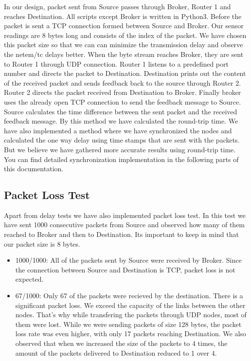 \documentclass[conference]{IEEEtran}
\begin{document}
In our design, packet sent from Source passes through Broker, Router 1 and reaches Destination. All scripts except Broker is written in Python3. Before the packet is sent a TCP connection formed between Source and Broker. Our sensor readings are 8 bytes long and consists of the index of the packet. We have chosen this packet size so that we can can minimize the transmission delay and observe the netem/tc delays better. When the byte stream reaches Broker, they are sent to Router 1 through UDP connection. Router 1 listens to a predefined port number and directs the packet to Destination. Destination prints out the content of the received packet and sends feedback back to the source through Router 2. Router 2 directs the packet received from Destination to Broker. Finally broker uses the already open TCP connection to send the feedback message to Source. Source calculates the time difference between the sent packet and the received feedback message. By this method we have calculated the round-trip time. We have also implemented a method where we have synchronized the nodes and calculated the one way delay using time stamps that are sent with the packets. But we believe we have gathered more accurate results using round-trip time. You can find detailed synchronization implementation in the following parts of this documentation.

\subsection{Packet Loss Test}\label{AA}

Apart from delay tests we have also implemented packet loss test. In this test we have sent 1000 consecutive packets from Source and observed how many of them reached to Broker and then to Destination. Its important to keep in mind that our packet size is 8 bytes. 
\begin{itemize}
\item 1000/1000: All of the packets sent by Source were received by Broker. Since the connection between Source and Destination is TCP, packet loss is not expected.
\item 67/1000: Only 67 of the packets were recieved by the destination. There is a significant packet loss. We exceed the capacity of the links between the other nodes. That's why while transfering the packets through UDP nodes, most of them were lost. While we were sending packets of size 128 bytes, the packet loss rate was even higher, with only 17 packets reaching Destination. We also observed that when we increased the size of the packets to 4 times, the amount of the packets delivered to Destination reduced to 1 over 4.
\end{itemize}
\end{document}
